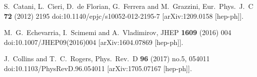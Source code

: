 \documentclass[10pt,a4paper]{article}
\begin{document}
\begin{thebibliography}{alp}

  S.~Catani, L.~Cieri, D.~de Florian, G.~Ferrera and M.~Grazzini,
  Eur.\ Phys.\ J.\ C {\bf 72} (2012) 2195
  doi:10.1140/epjc/s10052-012-2195-7
  [arXiv:1209.0158 [hep-ph]].

  M.~G.~Echevarria, I.~Scimemi and A.~Vladimirov,
  JHEP {\bf 1609} (2016) 004
  doi:10.1007/JHEP09(2016)004
  [arXiv:1604.07869 [hep-ph]].

  J.~Collins and T.~C.~Rogers,
  Phys.\ Rev.\ D {\bf 96} (2017) no.5,  054011
  doi:10.1103/PhysRevD.96.054011
  [arXiv:1705.07167 [hep-ph]].

\end{thebibliography}
\end{document}
